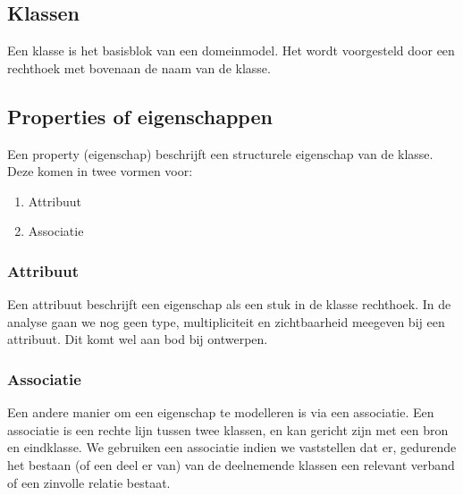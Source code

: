 \subsection{Klassen}
Een klasse is het basisblok van een domeinmodel. Het wordt voorgesteld door een rechthoek
met bovenaan de naam van de klasse. 

\subsection{Properties of eigenschappen}
Een property (eigenschap) beschrijft een structurele eigenschap van de klasse. Deze 
komen in twee vormen voor: 
\begin{enumerate}
	\item Attribuut
	\item Associatie
\end{enumerate}

\subsubsection{Attribuut}
Een attribuut beschrijft een eigenschap als een stuk in de klasse rechthoek. In 
de analyse gaan we nog geen type, multipliciteit en zichtbaarheid meegeven bij
een attribuut. Dit komt wel aan bod bij ontwerpen.

\subsubsection{Associatie}
Een andere manier om een eigenschap te modelleren is via een associatie. Een associatie
is een rechte lijn tussen twee klassen, en kan gericht zijn met een bron en eindklasse. We gebruiken een associatie indien we vaststellen  dat er, gedurende het bestaan (of een deel er van) van de deelnemende klassen een relevant verband of een zinvolle relatie bestaat.

